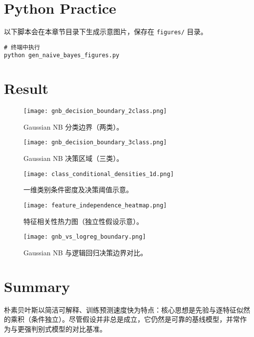 \documentclass[11pt]{article}
\begin{document}
\section{Python Practice}
以下脚本会在本章节目录下生成示意图片，保存在 \texttt{figures/} 目录。

\begin{lstlisting}[style=code,caption={生成朴素贝叶斯配图},label={lst:genfigs_cn}]
# 终端中执行
python gen_naive_bayes_figures.py
\end{lstlisting}

\section{Result}
\begin{figure}[H]
  \centering
  \texttt{[image: gnb\_decision\_boundary\_2class.png]}
  \caption{Gaussian NB 分类边界（两类）。}
  \label{fig:gnb2_cn}
\end{figure}
\FloatBarrier

\begin{figure}[H]
  \centering
  \texttt{[image: gnb\_decision\_boundary\_3class.png]}
  \caption{Gaussian NB 决策区域（三类）。}
  \label{fig:gnb3_cn}
\end{figure}
\FloatBarrier

\begin{figure}[H]
  \centering
  \texttt{[image: class\_conditional\_densities\_1d.png]}
  \caption{一维类别条件密度及决策阈值示意。}
  \label{fig:dens1d_cn}
\end{figure}
\FloatBarrier

\begin{figure}[H]
  \centering
  \texttt{[image: feature\_independence\_heatmap.png]}
  \caption{特征相关性热力图（独立性假设示意）。}
  \label{fig:heatmap_cn}
\end{figure}
\FloatBarrier

\begin{figure}[H]
  \centering
  \texttt{[image: gnb\_vs\_logreg\_boundary.png]}
  \caption{Gaussian NB 与逻辑回归决策边界对比。}
  \label{fig:nb_vs_lr_cn}
\end{figure}
\FloatBarrier

\section{Summary}
朴素贝叶斯以简洁可解释、训练预测速度快为特点：核心思想是先验与逐特征似然的乘积（条件独立）。尽管假设并非总是成立，它仍然是可靠的基线模型，并常作为与更强判别式模型的对比基准。
\end{document}
